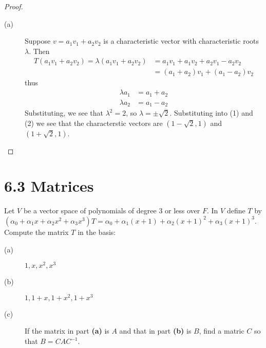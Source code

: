 \documentclass[12pt,leqno]{article}
\numberwithin{equation}{section}
\newcommand{\question}[2] {\vspace{.25in} \noindent\fbox{#1} #2 \vspace{.10in}}
\theoremstyle{definition}
\begin{document}
\begin{proof}
 \begin{description}
  \item [(a)] Suppose $v=a_1v_1+a_2v_2$ is a characteristic vector with characteristic roots $\lambda$. Then \begin{align*}T(a_1v_1+a_2v_2)=\lambda(a_1v_1+a_2v_2)&=a_1v_1+a_1v_2+a_2v_1-a_2v_2\\&=(a_1+a_2)v_1+(a_1-a_2)v_2\end{align*} thus \begin{align*}\tag{1}\lambda a_1&=a_1+a_2\\\tag{2}\lambda a_2&=a_1-a_2\end{align*} Substituting, we see that $\lambda^2=2$, so $\lambda=\pm\sqrt{2}$. Substituting into (1) and (2) we see that the characterstic vectors are $(1-\sqrt{2},1)$ and $(1+\sqrt{2},1)$.
 \end{description}

\end{proof}


\section*{6.3 Matrices}
\question{5}{Let $V$ be a vector space of polynomials of degree 3 or less over $F$. In $V$ define $T$ by $(\alpha_0+\alpha_1x+\alpha_2x^2+\alpha_3x^3)T=\alpha_0+\alpha_1(x+1)+\alpha_2(x+1)^2+\alpha_3(x+1)^3$. Compute the matrix $T$ in the basis:}
\begin{description}
 \item [(a)] $1,x,x^2,x^3$
 \item [(b)] $1,1+x,1+x^2,1+x^3$
 \item [(c)] If the matrix in part \textbf{(a)} is $A$ and that in part \textbf{(b)} is $B$, find a matric $C$ so that $B=CAC^{-1}$.
\end{description}
\end{document}
